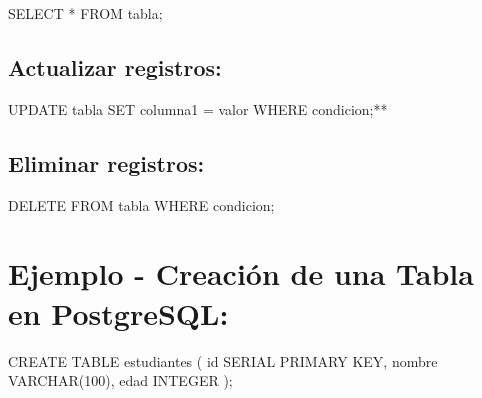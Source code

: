 \documentclass[
  a4paper,
  DIV=11,
  numbers=noendperiod,
  onepage,
  openany]{scrreprt}
\newenvironment{Shaded}{\begin{snugshade}}{\end{snugshade}}
\newcommand{\DataTypeTok}[1]{\textcolor[rgb]{0.68,0.00,0.00}{#1}}
\newcommand{\DecValTok}[1]{\textcolor[rgb]{0.68,0.00,0.00}{#1}}
\newcommand{\KeywordTok}[1]{\textcolor[rgb]{0.00,0.23,0.31}{#1}}
\newcommand{\NormalTok}[1]{\textcolor[rgb]{0.00,0.23,0.31}{#1}}
\newcommand{\OperatorTok}[1]{\textcolor[rgb]{0.37,0.37,0.37}{#1}}
\begin{document}
\begin{Shaded}
\begin{Highlighting}[]
\KeywordTok{SELECT} \OperatorTok{*} \KeywordTok{FROM}\NormalTok{ tabla;}
\end{Highlighting}
\end{Shaded}

\hypertarget{actualizar-registros-1}{%
\subsection{Actualizar registros:}\label{actualizar-registros-1}}

\begin{Shaded}
\begin{Highlighting}[]
\KeywordTok{UPDATE}\NormalTok{ tabla }\KeywordTok{SET}\NormalTok{ columna1 }\OperatorTok{=}\NormalTok{ valor }\KeywordTok{WHERE}\NormalTok{ condicion;}\OperatorTok{**}
\end{Highlighting}
\end{Shaded}

\hypertarget{eliminar-registros-1}{%
\subsection{Eliminar registros:}\label{eliminar-registros-1}}

\begin{Shaded}
\begin{Highlighting}[]
\KeywordTok{DELETE} \KeywordTok{FROM}\NormalTok{ tabla }\KeywordTok{WHERE}\NormalTok{ condicion;}
\end{Highlighting}
\end{Shaded}

\hypertarget{ejemplo---creaciuxf3n-de-una-tabla-en-postgresql-1}{%
\section{Ejemplo - Creación de una Tabla en
PostgreSQL:}\label{ejemplo---creaciuxf3n-de-una-tabla-en-postgresql-1}}

\begin{Shaded}
\begin{Highlighting}[]
\KeywordTok{CREATE} \KeywordTok{TABLE}\NormalTok{ estudiantes (}
    \KeywordTok{id}\NormalTok{ SERIAL }\KeywordTok{PRIMARY} \KeywordTok{KEY}\NormalTok{,}
\NormalTok{    nombre }\DataTypeTok{VARCHAR}\NormalTok{(}\DecValTok{100}\NormalTok{),}
\NormalTok{    edad }\DataTypeTok{INTEGER}
\NormalTok{);}
\end{Highlighting}
\end{Shaded}
\end{document}
